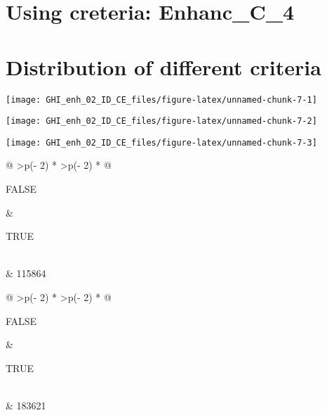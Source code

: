 \documentclass[
  10pt,
  a4paper,oneside]{article}
\begin{document}
\FloatBarrier

\hypertarget{using-creteria-enhanc_c_4}{%
\section{Using creteria: Enhanc\_C\_4}\label{using-creteria-enhanc_c_4}}

\hypertarget{distribution-of-different-criteria}{%
\section{Distribution of different criteria}\label{distribution-of-different-criteria}}

\begin{center}\texttt{[image: GHI\_enh\_02\_ID\_CE\_files/figure-latex/unnamed-chunk-7-1]} \end{center}

\begin{center}\texttt{[image: GHI\_enh\_02\_ID\_CE\_files/figure-latex/unnamed-chunk-7-2]} \end{center}

\begin{center}\texttt{[image: GHI\_enh\_02\_ID\_CE\_files/figure-latex/unnamed-chunk-7-3]} \end{center}

\begin{longtable}[]{@{}
  >{\raggedleft\arraybackslash}p{(\columnwidth - 2\tabcolsep) * }
  >{\raggedleft\arraybackslash}p{(\columnwidth - 2\tabcolsep) * }@{}}
\toprule\noalign{}
\begin{minipage}[b]{\linewidth}\raggedleft
FALSE
\end{minipage} & \begin{minipage}[b]{\linewidth}\raggedleft
TRUE
\end{minipage} \\
\midrule\noalign{}
\endhead
\bottomrule\noalign{}
 & 115864 \\
\end{longtable}

\begin{longtable}[]{@{}
  >{\raggedleft\arraybackslash}p{(\columnwidth - 2\tabcolsep) * }
  >{\raggedleft\arraybackslash}p{(\columnwidth - 2\tabcolsep) * }@{}}
\toprule\noalign{}
\begin{minipage}[b]{\linewidth}\raggedleft
FALSE
\end{minipage} & \begin{minipage}[b]{\linewidth}\raggedleft
TRUE
\end{minipage} \\
\midrule\noalign{}
\endhead
\bottomrule\noalign{}
 & 183621 \\
\end{longtable}
\end{document}
